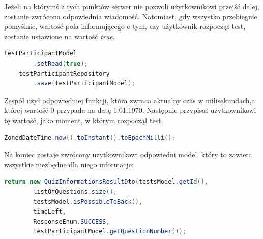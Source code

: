 \documentclass[twoside]{projektInzynierskiMS}
\numberwithin{figure}{section}
\begin{document}
Jeżeli na którymś z tych punktów serwer nie pozwoli użytkownikowi przejść dalej, zostanie zwrócona odpowiednia wiadomość. Natomiast, gdy wszystko przebiegnie pomyślnie, wartość pola informującego o tym, czy użytkownik rozpoczął test, zostanie ustawione na wartość \textit{true}.
\begin{lstlisting}[language=Java,caption=Zmiana i zaktualizowanie informacji w bazie danych. Źródło: Opracowanie własne.,captionpos=b]
    testParticipantModel
        .setRead(true);
    testParticipantRepository
        .save(testParticipantModel);
\end{lstlisting}
Zespół użył odpowiedniej funkcji, która zwraca aktualny czas w milisekundach,\linebreak a której wartość 0 przypada na datę 1.01.1970. Następnie przypisał użytkownikowi tę wartość, jako moment, w którym rozpoczął test.

\begin{lstlisting}[language=Java,caption=Metoda zwracająca aktualny czas w milisekundach. Źródło: Opracowanie własne.,captionpos=b]
    ZonedDateTime.now().toInstant().toEpochMilli();
\end{lstlisting}
Na koniec zostaje zwrócony użytkownikowi odpowiedni model, który to zawiera wszystkie niezbędne dla niego informacje:

\begin{lstlisting}[language=Java,caption=Utworzenie modelu oraz odesłanie informacji klientowi na jego podstawie. Źródło: Opracowanie własne.,captionpos=b]
    return new QuizInformationsResultDto(testsModel.getId(),
        listOfQuestions.size(),
        testsModel.isPossibleToBack(),
        timeLeft,
        ResponseEnum.SUCCESS,
        testParticipantModel.getQuestionNumber());
\end{lstlisting}
\newpage
\end{document}
